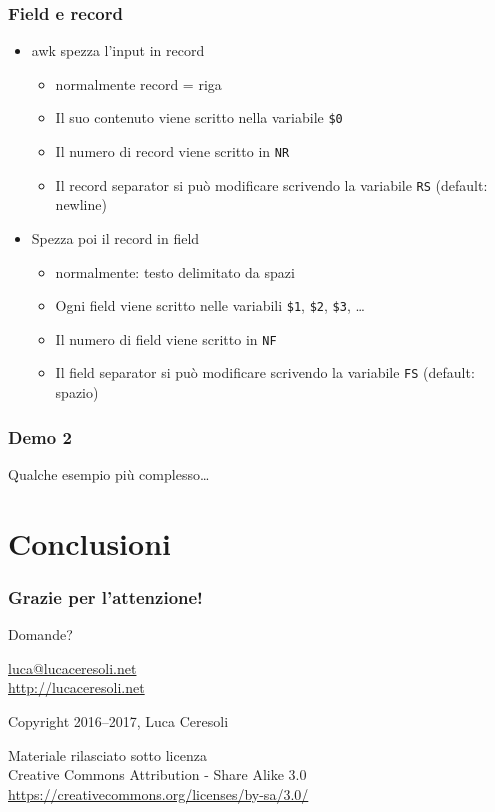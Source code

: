 \documentclass[xetex,table]{beamer}
\begin{document}
\begin{frame}[fragile]
  \frametitle{Field e record}
  \begin{itemize}
  \item awk spezza l'input in record
    \begin{itemize}
    \item normalmente record = riga
    \item Il suo contenuto viene scritto nella variabile \texttt{\$0}
    \item Il numero di record viene scritto in \texttt{NR}
    \item Il record separator si può modificare scrivendo la
      variabile \texttt{RS} (default: newline)
    \end{itemize}
  \item Spezza poi il record in field
    \begin{itemize}
    \item normalmente: testo delimitato da spazi
    \item Ogni field viene scritto nelle variabili \texttt{\$1},
      \texttt{\$2}, \texttt{\$3}, \dots
    \item Il numero di field viene scritto in \texttt{NF}
    \item Il field separator si può modificare scrivendo la variabile
      \texttt{FS} (default: spazio)
    \end{itemize}
  \end{itemize}
\end{frame}

\begin{frame}
  \frametitle{Demo 2}
  \begin{center}
    Qualche esempio più complesso\dots
  \end{center}
\end{frame}

\section{Conclusioni}

\begin{frame}
  \frametitle{Grazie per l'attenzione!}

  \begin{center}
    {\Huge Domande?}

    \vspace{0.1\textheight}

    \href{mailto:luca@lucaceresoli.net}{luca@lucaceresoli.net}\\
    \url{http://lucaceresoli.net}

    \textcopyright{} Copyright 2016--2017, Luca Ceresoli\\

    \vspace{0.2\textheight}

    \tiny
    Materiale rilasciato sotto licenza\\
    Creative Commons Attribution - Share Alike 3.0 \\
    \url{https://creativecommons.org/licenses/by-sa/3.0/} \\
\end{center}
\end{frame}
\end{document}

